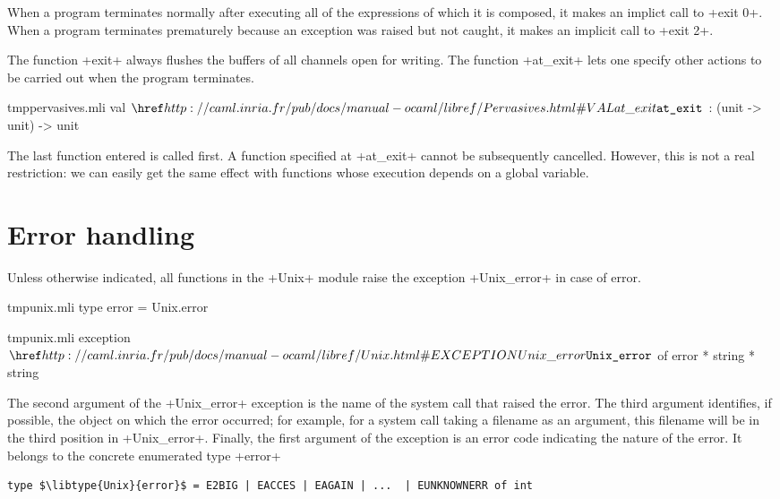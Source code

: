 %

When a program terminates normally after executing all of the
expressions of which it is composed, it makes an implict call to
\ml+exit 0+. When a program terminates prematurely because an
exception was raised but not caught, it makes an implicit call to
\ml+exit 2+.



The function \ml+exit+ always flushes the buffers of all channels open for
writing. The function \ml+at_exit+ lets one specify other actions
to be carried out when the program terminates.

%
\begin{listingcodefile}{tmppervasives.mli}
val $\indexlibvalue{Pervasives}{at\_exit}$ : (unit -> unit) -> unit
\end{listingcodefile}
%

The last function entered is called first. A function specified at
\ml+at_exit+ cannot be subsequently cancelled. However, this is not a
real restriction: we can easily get the same effect with functions
whose execution depends on a global variable.

\section{Error handling}

Unless otherwise indicated, all functions in the \ml+Unix+ module
raise the exception \ml+Unix_error+ in case of error.

\begin{codefile}{tmpunix.mli}
type error = Unix.error
\end{codefile}
%
\begin{listingcodefile}{tmpunix.mli}
exception $\libexn{Unix}{Unix\_error}$ of error * string * string
\end{listingcodefile}
%


The second argument of the \ml+Unix_error+ exception is the name of
the system call that raised the error. The third argument identifies,
if possible, the object on which the error occurred; for example, for
a system call taking a filename as an argument, this filename will be
in the third position in \ml+Unix_error+. Finally, the first argument
of the exception is an error code indicating the nature of the
error. It belongs to the concrete enumerated type \ml+error+

\begin{lstlisting}
type $\libtype{Unix}{error}$ = E2BIG | EACCES | EAGAIN | ...  | EUNKNOWNERR of int
\end{lstlisting}
%

